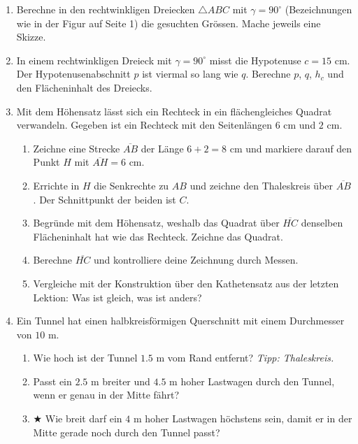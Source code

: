 \documentclass[11pt,oneside]{article}
\begin{document}
	\begin{aufgabe}
		\begin{enumerate}
			\item Berechne in den rechtwinkligen Dreiecken $\triangle ABC$ mit $\gamma=90^\circ$ (Bezeichnungen wie in der Figur auf Seite 1) die gesuchten Grössen. Mache jeweils eine Skizze.
			\item In einem rechtwinkligen Dreieck mit $\gamma=90^\circ$ misst die Hypotenuse $c=15$ cm. Der Hypotenusenabschnitt $p$ ist viermal so lang wie $q$. Berechne $p$, $q$, $h_c$ und den Flächeninhalt des Dreiecks.
			\item Mit dem Höhensatz lässt sich ein Rechteck in ein flächengleiches Quadrat verwandeln. Gegeben ist ein Rechteck mit den Seitenlängen $6$ cm und $2$ cm.
			\begin{enumerate}[label=\alph*)]
				\item Zeichne eine Strecke $\overline{AB}$ der Länge $6+2=8$ cm und markiere darauf den Punkt $H$ mit $\overline{AH}=6$ cm.
				\item Errichte in $H$ die Senkrechte zu $AB$ und zeichne den Thaleskreis über $\overline{AB}$. Der Schnittpunkt der beiden ist $C$.
				\item Begründe mit dem Höhensatz, weshalb das Quadrat über $\overline{HC}$ denselben Flächeninhalt hat wie das Rechteck. Zeichne das Quadrat.
				\item Berechne $\overline{HC}$ und kontrolliere deine Zeichnung durch Messen.
				\item Vergleiche mit der Konstruktion über den Kathetensatz aus der letzten Lektion: Was ist gleich, was ist anders?
			\end{enumerate}
			\item Ein Tunnel hat einen halbkreisförmigen Querschnitt mit einem Durchmesser von $10$ m.
			\begin{enumerate}[label=\alph*)]
				\item Wie hoch ist der Tunnel $1.5$ m vom Rand entfernt? \textit{Tipp: Thaleskreis.}
				\item Passt ein $2.5$ m breiter und $4.5$ m hoher Lastwagen durch den Tunnel, wenn er genau in der Mitte fährt?
				\item $\bigstar$ Wie breit darf ein $4$ m hoher Lastwagen höchstens sein, damit er in der Mitte gerade noch durch den Tunnel passt?
			\end{enumerate}
		\end{enumerate}
	\end{aufgabe}
\end{document}
